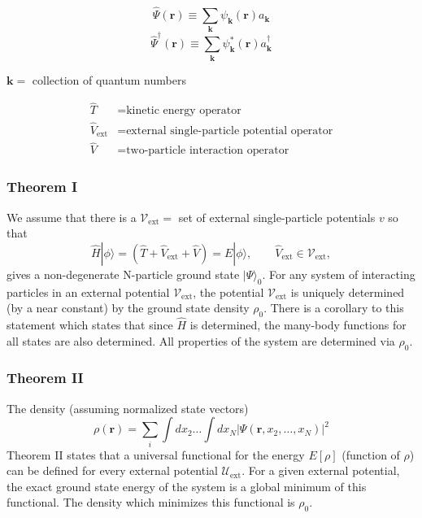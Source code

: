 \documentclass[compress]{beamer}
\newcommand*{\ket}[1]{|#1\rangle}
\begin{document}
\frame
{
  \frametitle{}
\begin{small}
{\scriptsize
  \begin{equation}
    \hat{\Psi}(\mathbf{r})\equiv \sum_{\mathbf{k}}\psi_{\mathbf{k}}(\mathbf{r})a_{\mathbf{k}} \nonumber
  \end{equation}
  \begin{equation}
    \hat{\Psi}^{\dagger }(\mathbf{r})\equiv \sum_{\mathbf{k}}\psi_{\mathbf{k}}^{*}(\mathbf{r})a_{\mathbf{k}}^{\dagger } \nonumber
  \end{equation}
\begin{center}
$\mathbf{k} = $ collection of quantum numbers
\end{center}

\begin{align}
  \hat{T} &= \text{kinetic energy operator} \nonumber \\
  \hat{V}_{\mathrm{ext}} &= \text{external single-particle potential operator} \nonumber \\
  \hat{V} &= \text{two-particle interaction operator} \nonumber
\end{align}
}
\end{small}
}

\frame
{
  \frametitle{Theorem I}
\begin{small}
{\scriptsize
We assume that there is a
$\mathcal{V}_{\mathrm{ext}} =$ set of external single-particle \alert{potentials} $v$ so that
\begin{equation}
\hat{H}\ket{\phi} = \left(\hat{T}+\hat{V}_{\mathrm{ext}}+\hat{V}\right)=E\ket{\phi},\qquad \hat{V}_{\mathrm{ext}}\in \mathcal{V}_{\mathrm{ext}},\nonumber
\end{equation} 
gives a \alert{non-degenerate} N-particle ground state $\ket{\Psi }_0$.
For any system of interacting particles in an external potential 
$\mathcal{V}_{\mathrm{ext}}$, the potential $\mathcal{V}_{\mathrm{ext}}$ is uniquely 
determined (by a near constant) by the ground state density $\rho_0$.
There is a corollary to this statement which states that since $\hat{H}$ is determined, the many-body functions for all states are also determined. All properties of the system are determined via $\rho_0$.
}
\end{small}
}


\frame
{
  \frametitle{Theorem II}
\begin{small}
{\scriptsize
The density (assuming normalized state vectors)
\begin{equation}
  \rho(\mathbf{r})=\sum_{i}\int dx_{2}\dots \int dx_{N}\vert \Psi(\mathbf{r},x_{2},\dots ,x_{N})\vert^{2} \nonumber
\end{equation}
Theorem II states that a universal functional for the energy $E[\rho]$ (function of $\rho$) can be defined for every external potential
$\mathcal{U}_{\mathrm{ext}}$. For a given external potential, the exact ground state energy of the system is a global minimum of this functional. The density which minimizes this functional is $\rho_0$.
}
\end{small}
}
\end{document}
